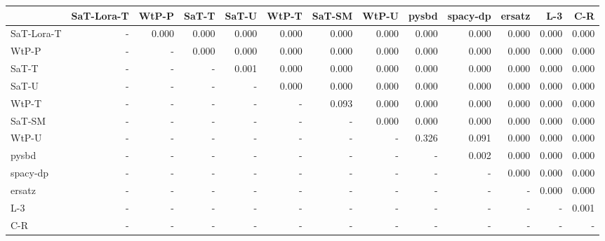 \begin{tabular}{lrrrrrrrrrrrr}
\toprule
 & SaT-Lora-T & WtP-P & SaT-T & SaT-U & WtP-T & SaT-SM & WtP-U & pysbd & spacy-dp & ersatz & L-3 & C-R \\
\midrule
SaT-Lora-T & - & 0.000 & 0.000 & 0.000 & 0.000 & 0.000 & 0.000 & 0.000 & 0.000 & 0.000 & 0.000 & 0.000 \\
WtP-P & - & - & 0.000 & 0.000 & 0.000 & 0.000 & 0.000 & 0.000 & 0.000 & 0.000 & 0.000 & 0.000 \\
SaT-T & - & - & - & 0.001 & 0.000 & 0.000 & 0.000 & 0.000 & 0.000 & 0.000 & 0.000 & 0.000 \\
SaT-U & - & - & - & - & 0.000 & 0.000 & 0.000 & 0.000 & 0.000 & 0.000 & 0.000 & 0.000 \\
WtP-T & - & - & - & - & - & 0.093 & 0.000 & 0.000 & 0.000 & 0.000 & 0.000 & 0.000 \\
SaT-SM & - & - & - & - & - & - & 0.000 & 0.000 & 0.000 & 0.000 & 0.000 & 0.000 \\
WtP-U & - & - & - & - & - & - & - & 0.326 & 0.091 & 0.000 & 0.000 & 0.000 \\
pysbd & - & - & - & - & - & - & - & - & 0.002 & 0.000 & 0.000 & 0.000 \\
spacy-dp & - & - & - & - & - & - & - & - & - & 0.000 & 0.000 & 0.000 \\
ersatz & - & - & - & - & - & - & - & - & - & - & 0.000 & 0.000 \\
L-3 & - & - & - & - & - & - & - & - & - & - & - & 0.001 \\
C-R & - & - & - & - & - & - & - & - & - & - & - & - \\
\bottomrule
\end{tabular}

